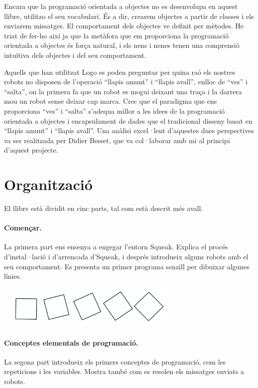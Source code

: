 Encara que la programació orientada a objectes no es desenvolupa en aquest 
llibre, utilitzo el seu vocabulari. És a dir, crearem objectes a partir de
classes i els enviarem missatges. El comportament dels objectes ve definit per
mètodes. He triat de fer-ho així ja que la metàfora que em proporciona la 
programació orientada a objectes és força natural, i els nens i nenes tenen una
comprensió intuïtiva dels objectes i del seu comportament.

Aquells que han utilitzat Logo es poden preguntar per quina raó els nostres
robots no disposen de l'operació ``llapis amunt'' i ``llapis avall'', enlloc
de ``ves'' i ``salta'', on la primera fa que un robot es mogui deixant una
traça i la darrera mou un robot sense deixar cap marca. Crec que el paradigma
que ens proporciona ``ves'' i ``salta'' s'adequa millor a les idees de la 
programació orientada a objectes i encapsulament de dades que el tradicional
disseny basat en ``llapis amunt'' i ``llapis avall''. Una anàlisi excel·lent 
d'aquestes dues perspectives va ser realitzada per Didier Besset, que va 
col·laborar amb mi al principi d'aquest projecte.

\section*{Organització}

El llibre està dividit en cinc parts, tal com està descrit més avall.

\paragraph{Començar.}  La primera part ens ensenya a engegar l'entorn Squeak. Explica
el procés d'instal·lació i d'arrencada d'Squeak, i després introdueix alguns 
robots amb el seu comportament. Es presenta un primer programa senzill per 
dibuixar algunes línies.

\vspace{5mm}
\includegraphics[height=20mm ,width=90mm ]{Imatges/Preface1.jpg}

\paragraph{Conceptes elementals de programació.} La segona part introdueix els 
primers conceptes de programació, com les repeticions i les variables. Mostra també com 
es resolen els missatges enviats a robots.

